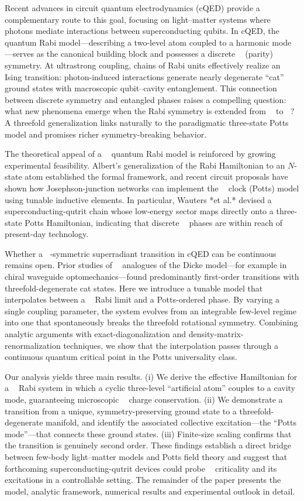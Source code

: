 \documentclass[reprint, aps, prx, amsmath, amssymb, longbibliography, superscriptaddress]{revtex4-2}
\DeclareMathOperator{\Zthree}{\mathbb{Z}_3}
\DeclareMathOperator{\Ztwo}{\mathbb{Z}_2}
\begin{document}
Recent advances in circuit quantum electrodynamics (cQED) provide a complementary route to this goal, focusing on light–matter systems where photons mediate interactions between superconducting qubits. In cQED, the quantum Rabi model—describing a two-level atom coupled to a harmonic mode—serves as the canonical building block and possesses a discrete $\Ztwo $ (parity) symmetry. At ultrastrong coupling, chains of Rabi units effectively realize an Ising transition: photon-induced interactions generate nearly degenerate “cat” ground states with macroscopic qubit–cavity entanglement. This connection between discrete symmetry and entangled phases raises a compelling question: what new phenomena emerge when the Rabi symmetry is extended from $\Ztwo$ to $\Zthree$? A threefold generalization links naturally to the paradigmatic three-state Potts model and promises richer symmetry-breaking behavior.

The theoretical appeal of a $\Zthree$ quantum Rabi model is reinforced by growing experimental feasibility. Albert’s generalization of the Rabi Hamiltonian to an $N$-state atom established the formal framework, and recent circuit proposals have shown how Josephson-junction networks can implement the $\Zthree$ clock (Potts) model using tunable inductive elements. In particular, Wauters *et al.* devised a superconducting-qutrit chain whose low-energy sector maps directly onto a three-state Potts Hamiltonian, indicating that discrete $\Zthree$ phases are within reach of present-day technology.

Whether a $\Zthree$-symmetric superradiant transition in cQED can be continuous remains open. Prior studies of $\Zthree$ analogues of the Dicke model—for example in chiral waveguide optomechanics—found predominantly first-order transitions with threefold-degenerate cat states. Here we introduce a tunable model that interpolates between a $\Zthree$ Rabi limit and a Potts-ordered phase. By varying a single coupling parameter, the system evolves from an integrable few-level regime into one that spontaneously breaks the threefold rotational symmetry. Combining analytic arguments with exact-diagonalization and density-matrix-renormalization techniques, we show that the interpolation passes through a continuous quantum critical point in the Potts universality class.

Our analysis yields three main results. (i) We derive the effective Hamiltonian for a $\Zthree$ Rabi system in which a cyclic three-level “artificial atom” couples to a cavity mode, guaranteeing microscopic $\Zthree$ charge conservation. (ii) We demonstrate a transition from a unique, symmetry-preserving ground state to a threefold-degenerate manifold, and identify the associated collective excitation—the “Potts mode”—that connects these ground states. (iii) Finite-size scaling confirms that the transition is genuinely second order. These findings establish a direct bridge between few-body light–matter models and Potts field theory and suggest that forthcoming superconducting-qutrit devices could probe $\Zthree$ criticality and its excitations in a controllable setting. The remainder of the paper presents the model, analytic framework, numerical results and experimental outlook in detail.
\end{document}
